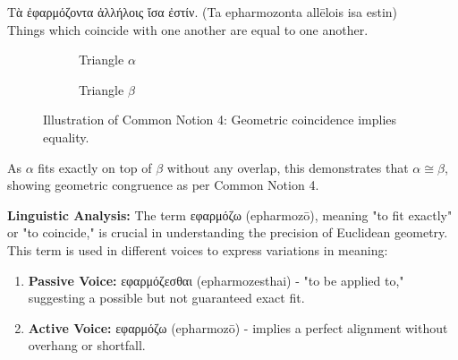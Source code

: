 \begin{cn}
\textgreek{Τὰ ἐφαρμόζοντα ἀλλήλοις ἴσα ἐστίν.} (Ta epharmozonta allēlois isa estin) \\
Things which coincide with one another are equal to one another.
\end{cn}

\begin{figure}[H]
\centering
\begin{subfigure}{0.3\textwidth}
\centering
{}
\caption{Triangle $\alpha$}
\end{subfigure}%
\begin{subfigure}{0.3\textwidth}
\centering
{}
\caption{Triangle $\beta$}
\end{subfigure}
\begin{subfigure}{0.3\textwidth}
\centering
{}
\end{subfigure}
\caption{Illustration of Common Notion 4: Geometric coincidence implies equality.}
\end{figure}

As $\alpha$ fits exactly on top of $\beta$ without any overlap, this demonstrates that $\alpha \cong \beta$, showing geometric congruence as per Common Notion 4.

\textbf{Linguistic Analysis:}
The term \textgreek{εφαρμόζω} (epharmozō), meaning "to fit exactly" or "to coincide," is crucial in understanding the precision of Euclidean geometry. This term is used in different voices to express variations in meaning:
\begin{enumerate}
\item \textbf{Passive Voice:} \textgreek{εφαρμόζεσθαι} (epharmozesthai) - "to be applied to," suggesting a possible but not guaranteed exact fit.
\item \textbf{Active Voice:} \textgreek{εφαρμόζω} (epharmozō) - implies a perfect alignment without overhang or shortfall.
\end{enumerate}

